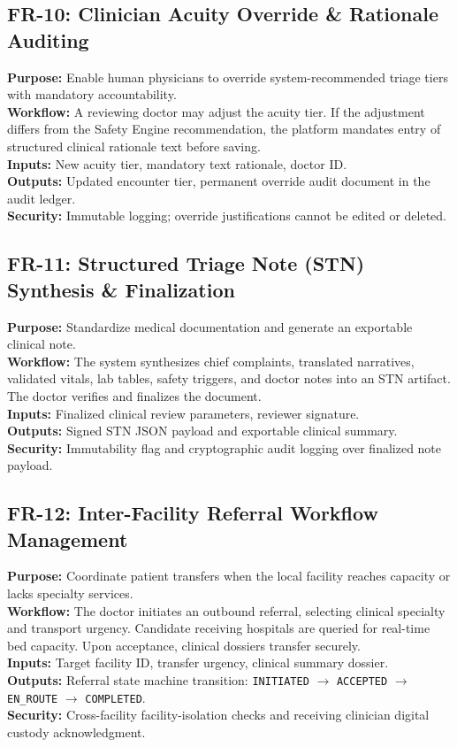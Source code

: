 \documentclass[11pt,a4paper,oneside]{report}
\begin{document}
\subsection{FR-10: Clinician Acuity Override \& Rationale Auditing}
\textbf{Purpose:} Enable human physicians to override system-recommended triage tiers with mandatory accountability.\\
\textbf{Workflow:} A reviewing doctor may adjust the acuity tier. If the adjustment differs from the Safety Engine recommendation, the platform mandates entry of structured clinical rationale text before saving.\\
\textbf{Inputs:} New acuity tier, mandatory text rationale, doctor ID.\\
\textbf{Outputs:} Updated encounter tier, permanent override audit document in the audit ledger.\\
\textbf{Security:} Immutable logging; override justifications cannot be edited or deleted.

\subsection{FR-11: Structured Triage Note (STN) Synthesis \& Finalization}
\textbf{Purpose:} Standardize medical documentation and generate an exportable clinical note.\\
\textbf{Workflow:} The system synthesizes chief complaints, translated narratives, validated vitals, lab tables, safety triggers, and doctor notes into an STN artifact. The doctor verifies and finalizes the document.\\
\textbf{Inputs:} Finalized clinical review parameters, reviewer signature.\\
\textbf{Outputs:} Signed STN JSON payload and exportable clinical summary.\\
\textbf{Security:} Immutability flag and cryptographic audit logging over finalized note payload.

\subsection{FR-12: Inter-Facility Referral Workflow Management}
\textbf{Purpose:} Coordinate patient transfers when the local facility reaches capacity or lacks specialty services.\\
\textbf{Workflow:} The doctor initiates an outbound referral, selecting clinical specialty and transport urgency. Candidate receiving hospitals are queried for real-time bed capacity. Upon acceptance, clinical dossiers transfer securely.\\
\textbf{Inputs:} Target facility ID, transfer urgency, clinical summary dossier.\\
\textbf{Outputs:} Referral state machine transition: \texttt{INITIATED} $\to$ \texttt{ACCEPTED} $\to$ \texttt{EN\_ROUTE} $\to$ \texttt{COMPLETED}.\\
\textbf{Security:} Cross-facility facility-isolation checks and receiving clinician digital custody acknowledgment.
\end{document}
